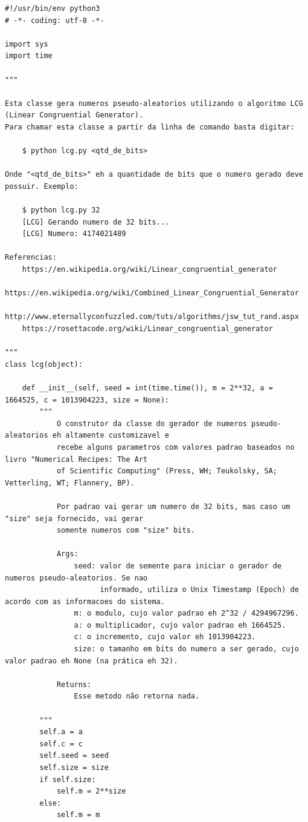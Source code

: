 \documentclass[a4paper,11pt]{article}
\theoremstyle{mytheor}
\begin{document}
\begin{lstlisting}[caption=Arquivo lcg.py.]
#!/usr/bin/env python3
# -*- coding: utf-8 -*-

import sys
import time

"""

Esta classe gera numeros pseudo-aleatorios utilizando o algoritmo LCG (Linear Congruential Generator).
Para chamar esta classe a partir da linha de comando basta digitar:
    
    $ python lcg.py <qtd_de_bits>

Onde "<qtd_de_bits>" eh a quantidade de bits que o numero gerado deve possuir. Exemplo:

    $ python lcg.py 32
    [LCG] Gerando numero de 32 bits...
    [LCG] Numero: 4174021489

Referencias:
    https://en.wikipedia.org/wiki/Linear_congruential_generator
    https://en.wikipedia.org/wiki/Combined_Linear_Congruential_Generator
    http://www.eternallyconfuzzled.com/tuts/algorithms/jsw_tut_rand.aspx
    https://rosettacode.org/wiki/Linear_congruential_generator

"""
class lcg(object):

    def __init__(self, seed = int(time.time()), m = 2**32, a = 1664525, c = 1013904223, size = None):
        """
            O construtor da classe do gerador de numeros pseudo-aleatorios eh altamente customizavel e
            recebe alguns parametros com valores padrao baseados no livro "Numerical Recipes: The Art 
            of Scientific Computing" (Press, WH; Teukolsky, SA; Vetterling, WT; Flannery, BP).

            Por padrao vai gerar um numero de 32 bits, mas caso um "size" seja fornecido, vai gerar
            somente numeros com "size" bits.

            Args:
                seed: valor de semente para iniciar o gerador de numeros pseudo-aleatorios. Se nao 
                      informado, utiliza o Unix Timestamp (Epoch) de acordo com as informacoes do sistema.
                m: o modulo, cujo valor padrao eh 2^32 / 4294967296.
                a: o multiplicador, cujo valor padrao eh 1664525.
                c: o incremento, cujo valor eh 1013904223.
                size: o tamanho em bits do numero a ser gerado, cujo valor padrao eh None (na prática eh 32).

            Returns:
                Esse metodo não retorna nada.
                
        """
        self.a = a
        self.c = c
        self.seed = seed
        self.size = size
        if self.size:
            self.m = 2**size
        else:
            self.m = m


\end{lstlisting}
\end{document}
